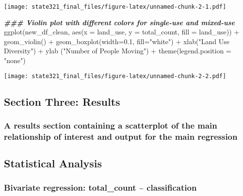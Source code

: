 \documentclass[
]{article}
\newenvironment{Shaded}{\begin{snugshade}}{\end{snugshade}}
\newcommand{\AttributeTok}[1]{\textcolor[rgb]{0.77,0.63,0.00}{#1}}
\newcommand{\DocumentationTok}[1]{\textcolor[rgb]{0.56,0.35,0.01}{\textbf{\textit{#1}}}}
\newcommand{\FloatTok}[1]{\textcolor[rgb]{0.00,0.00,0.81}{#1}}
\newcommand{\FunctionTok}[1]{\textcolor[rgb]{0.00,0.00,0.00}{#1}}
\newcommand{\NormalTok}[1]{#1}
\newcommand{\SpecialCharTok}[1]{\textcolor[rgb]{0.00,0.00,0.00}{#1}}
\newcommand{\StringTok}[1]{\textcolor[rgb]{0.31,0.60,0.02}{#1}}
\begin{document}
\texttt{[image: state321\_final\_files/figure-latex/unnamed-chunk-2-1.pdf]}

\begin{Shaded}
\begin{Highlighting}[]
\DocumentationTok{\#\#\# Violin plot with different colors for single{-}use and mixed{-}use}
\FunctionTok{ggplot}\NormalTok{(new\_df\_clean, }\FunctionTok{aes}\NormalTok{(}\AttributeTok{x =}\NormalTok{ land\_use, }\AttributeTok{y =}\NormalTok{ total\_count, }\AttributeTok{fill =}\NormalTok{ land\_use)) }\SpecialCharTok{+}
  \FunctionTok{geom\_violin}\NormalTok{() }\SpecialCharTok{+}
  \FunctionTok{geom\_boxplot}\NormalTok{(}\AttributeTok{width=}\FloatTok{0.1}\NormalTok{, }\AttributeTok{fill=}\StringTok{"white"}\NormalTok{) }\SpecialCharTok{+}
  \FunctionTok{xlab}\NormalTok{(}\StringTok{"Land Use Diversity"}\NormalTok{) }\SpecialCharTok{+}
  \FunctionTok{ylab}\NormalTok{ (}\StringTok{"Number of People Moving"}\NormalTok{) }\SpecialCharTok{+}
  \FunctionTok{theme}\NormalTok{(}\AttributeTok{legend.position =} \StringTok{"none"}\NormalTok{)}
\end{Highlighting}
\end{Shaded}

\texttt{[image: state321\_final\_files/figure-latex/unnamed-chunk-2-2.pdf]}

\hypertarget{section-three-results}{%
\subsection{Section Three: Results}\label{section-three-results}}

\hypertarget{a-results-section-containing-a-scatterplot-of-the-main-relationship-of-interest-and-output-for-the-main-regression}{%
\subsubsection{A results section containing a scatterplot of the main
relationship of interest and output for the main
regression}\label{a-results-section-containing-a-scatterplot-of-the-main-relationship-of-interest-and-output-for-the-main-regression}}

\hypertarget{statistical-analysis}{%
\subsection{Statistical Analysis}\label{statistical-analysis}}

\hypertarget{bivariate-regression-total_count-classification}{%
\subsubsection{Bivariate regression: total\_count \textasciitilde{}
classification}\label{bivariate-regression-total_count-classification}}
\end{document}
